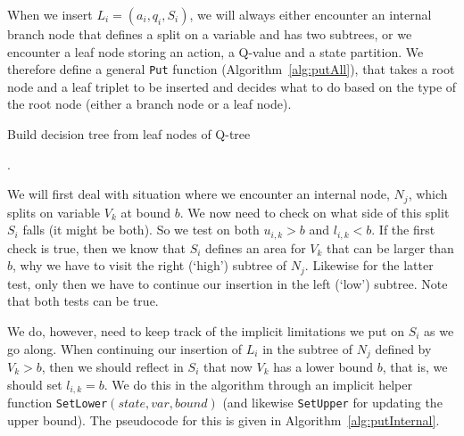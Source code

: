 When we insert $L_i = (a_i, q_i, S_i)$, we will always either encounter an
internal branch node that defines a split on a variable and has two subtrees, or
we encounter a leaf node storing an action, a Q-value and a state partition. We
therefore define a general \texttt{Put} function (Algorithm~\ref{alg:putAll}),
that takes a root node and a leaf triplet to be inserted and decides what to do based
on the type of the root node (either a branch node or a leaf node).

\begin{algorithm}[ht]
    \caption{Build decision tree from leaf nodes of Q-tree}\label{alg:putAll}.

    \begin{algorithmic}[1]
        \Else{}%
        \EndIf%
        \EndFunction%
    \end{algorithmic}

\end{algorithm}

We will first deal with situation where we encounter an internal node, $N_j$,
which splits on variable $V_k$ at bound $b$. We now need to check on what side
of this split $S_i$ falls (it might be both). So we test on both $u_{i,k} > b$
and $l_{i,k} < b$. If the first check is true, then we know that $S_i$ defines
an area for $V_k$ that can be larger than $b$, why we have to visit the right
(`high') subtree of $N_j$. Likewise for the latter test, only then we have to
continue our insertion in the left (`low') subtree. Note that both tests
can be true.

We do, however, need to keep track of the implicit limitations we put on $S_i$
as we go along. When continuing our insertion of $L_i$ in the subtree of $N_j$
defined by $V_k > b$, then we should reflect in $S_i$ that now $V_k$ has a lower
bound $b$, that is, we should set $l_{i,k} = b$. We do this in the algorithm
through an implicit helper function \texttt{SetLower$(state, var, bound)$} (and
likewise \texttt{SetUpper} for updating the upper bound). The pseudocode for
this is given in Algorithm~\ref{alg:putInternal}.

